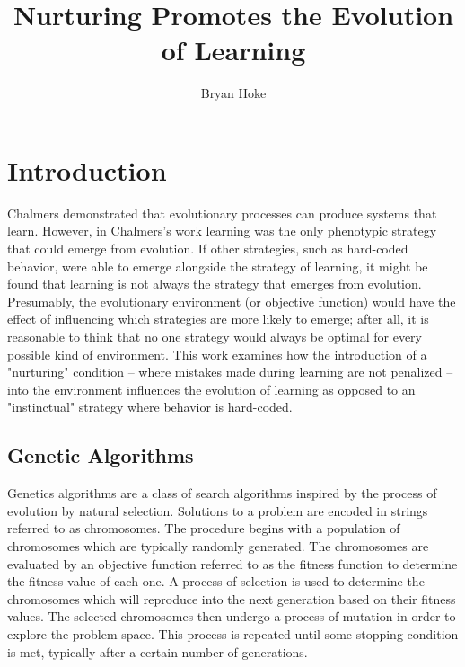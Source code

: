 \documentclass[master]{outhesis}
\title{Nurturing Promotes the Evolution of Learning}
\author{Bryan Hoke}
\begin{document}
\makefrontmatter

\chapter{Introduction}

Chalmers \cite{chalmers-evolution-learning} demonstrated that evolutionary processes can produce systems that learn.
However, in Chalmers's work learning was the only phenotypic strategy that could emerge from evolution.
If other strategies, such as hard-coded behavior, were able to emerge alongside the strategy of learning, it might be found that learning is not always the strategy that emerges from evolution.
Presumably, the evolutionary environment (or objective function) would have the effect of influencing which strategies are more likely to emerge; after all, it is reasonable to think that no one strategy would always be optimal for every possible kind of environment.
This work examines how the introduction of a "nurturing" condition -- where mistakes made during learning are not penalized -- into the environment influences the evolution of learning as opposed to an "instinctual" strategy where behavior is hard-coded.

\section{Genetic Algorithms}





Genetics algorithms are a class of search algorithms inspired by the process of evolution by natural selection.
Solutions to a problem are encoded in strings referred to as chromosomes.
The procedure begins with a population of chromosomes which are typically randomly generated.
The chromosomes are evaluated by an objective function referred to as the fitness function to determine the fitness value of each one.
A process of selection is used to determine the chromosomes which will reproduce into the next generation based on their fitness values.
The selected chromosomes then undergo a process of mutation in order to explore the problem space.
This process is repeated until some stopping condition is met, typically after a certain number of generations.
\end{document}
